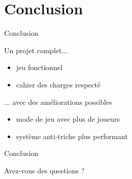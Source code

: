 \documentclass[french]{beamer}
\begin{document}
\section*{Conclusion}

		\begin{frame}{Conclusion}
			\begin{block}{Un projet complet...}
				\begin{itemize}
					\item jeu fonctionnel
					\item cahier des charges respecté
				\end{itemize}
			\end{block}

			\begin{block}{... avec des améliorations possibles}
				\begin{itemize}
					\item mode de jeu avec plus de joueurs
					\item système anti-triche plus performant
				\end{itemize}
			\end{block}
		\end{frame}

		\begin{frame}{Conclusion}
			\begin{center}
				\Large{Avez-vous des questions ?}
			\end{center}
		\end{frame}




	
\end{document}

